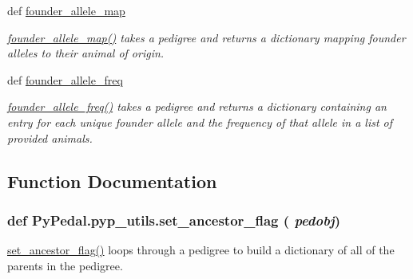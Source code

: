 \begin{CompactItemize}
def \hyperlink{namespacePyPedal_1_1pyp__utils_1959b9ea868a51acec12651b97868538}{founder\_\-allele\_\-map}
\begin{CompactList}\small\item\em \hyperlink{namespacePyPedal_1_1pyp__utils_1959b9ea868a51acec12651b97868538}{founder\_\-allele\_\-map()} takes a pedigree and returns a dictionary mapping founder alleles to their animal of origin. \item\end{CompactList}\item 
def \hyperlink{namespacePyPedal_1_1pyp__utils_a3b4f214f889ea58a62840950ae0e957}{founder\_\-allele\_\-freq}
\begin{CompactList}\small\item\em \hyperlink{namespacePyPedal_1_1pyp__utils_a3b4f214f889ea58a62840950ae0e957}{founder\_\-allele\_\-freq()} takes a pedigree and returns a dictionary containing an entry for each unique founder allele and the frequency of that allele in a list of provided animals. \item\end{CompactList}\end{CompactItemize}


\subsection{Function Documentation}
\hypertarget{namespacePyPedal_1_1pyp__utils_fa9c95bf96313a8a0c9d5b2dfd9bd0a5}{
\subsubsection[set\_\-ancestor\_\-flag]{\setlength{\rightskip}{0pt plus 5cm}def Py\-Pedal.pyp\_\-utils.set\_\-ancestor\_\-flag ( {\em pedobj})}}
\label{namespacePyPedal_1_1pyp__utils_fa9c95bf96313a8a0c9d5b2dfd9bd0a5}


\hyperlink{namespacePyPedal_1_1pyp__utils_fa9c95bf96313a8a0c9d5b2dfd9bd0a5}{set\_\-ancestor\_\-flag()} loops through a pedigree to build a dictionary of all of the parents in the pedigree. 

